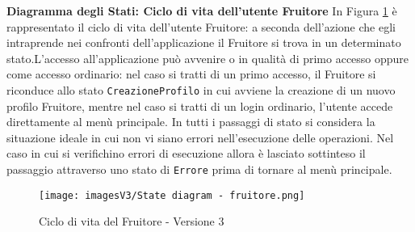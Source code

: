 \textbf{Diagramma degli Stati: Ciclo di vita dell'utente Fruitore}\newline
In Figura \ref{fig:State diagram 3.2} è rappresentato il ciclo di vita dell'utente Fruitore: a seconda dell'azione che egli intraprende nei confronti dell'applicazione il Fruitore si trova in un determinato stato.\newline L'accesso all'applicazione può avvenire o in qualità di primo accesso oppure come accesso ordinario: nel caso si tratti di un primo accesso, il Fruitore si riconduce allo stato \texttt{CreazioneProfilo} in cui avviene la creazione di un nuovo profilo Fruitore, mentre nel caso si tratti di un login ordinario, l'utente accede direttamente al menù principale. \newline 
In tutti i passaggi di stato si considera la situazione ideale in cui non vi siano errori nell'esecuzione delle operazioni. Nel caso in cui si verifichino errori di esecuzione allora è lasciato sottinteso il passaggio attraverso uno stato di \texttt{Errore} prima di tornare al menù principale.

\begin{figure}[h!]
\centering
\texttt{[image: imagesV3/State diagram - fruitore.png]}
\caption{\label{fig:State diagram 3.2}Ciclo di vita del Fruitore - Versione 3}
\end{figure}\bigskip